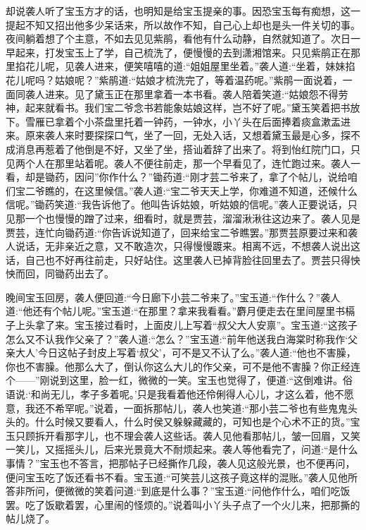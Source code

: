 \begin{parag}
    却说袭人听了宝玉方才的话，也明知是给宝玉提亲的事。因恐宝玉每有痴想，这一提起不知又招出他多少呆话来，所以故作不知，自己心上却也是头一件关切的事。夜间躺着想了个主意，不如去见见紫鹃，看他有什么动静，自然就知道了。次日一早起来，打发宝玉上了学，自己梳洗了，便慢慢的去到潇湘馆来。只见紫鹃正在那里掐花儿呢，见袭人进来，便笑嘻嘻的道:“姐姐屋里坐着。”袭人道:“坐着，妹妹掐花儿呢吗？姑娘呢？”紫鹃道:“姑娘才梳洗完了，等着温药呢。”紫鹃一面说着，一面同袭人进来。见了黛玉正在那里拿着一本书看。袭人陪着笑道:“姑娘怨不得劳神，起来就看书。我们宝二爷念书若能象姑娘这样，岂不好了呢。”黛玉笑着把书放下。雪雁已拿着个小茶盘里托着一钟药，一钟水，小丫头在后面捧着痰盒漱盂进来。原来袭人来时要探探口气，坐了一回，无处入话，又想着黛玉最是心多，探不成消息再惹着了他倒是不好，又坐了坐，搭讪着辞了出来了。将到怡红院门口，只见两个人在那里站着呢。袭人不便往前走，那一个早看见了，连忙跑过来。袭人一看，却是锄药，因问”你作什么？”锄药道:“刚才芸二爷来了，拿了个帖儿，说给咱们宝二爷瞧的，在这里候信。”袭人道:“宝二爷天天上学，你难道不知道，还候什么信呢。”锄药笑道:“我告诉他了。他叫告诉姑娘，听姑娘的信呢。”袭人正要说话，只见那一个也慢慢的蹭了过来，细看时，就是贾芸，溜溜湫湫往这边来了。袭人见是贾芸，连忙向锄药道:“你告诉说知道了，回来给宝二爷瞧罢。”那贾芸原要过来和袭人说话，无非亲近之意，又不敢造次，只得慢慢踱来。相离不远，不想袭人说出这话，自己也不好再往前走，只好站住。这里袭人已掉背脸往回里去了。贾芸只得怏怏而回，同锄药出去了。
\end{parag}


\begin{parag}
    晚间宝玉回房，袭人便回道:“今日廊下小芸二爷来了。”宝玉道:“作什么？”袭人道:“他还有个帖儿呢。”宝玉道:“在那里？拿来我看看。”麝月便走去在里间屋里书槅子上头拿了来。宝玉接过看时，上面皮儿上写着“叔父大人安禀”。宝玉道:“这孩子怎么又不认我作父亲了？”袭人道:“怎么？”宝玉道:“前年他送我白海棠时称我作‘父亲大人’今日这帖子封皮上写着‘叔父’，可不是又不认了么。”袭人道:“他也不害臊，你也不害臊。他那么大了，倒认你这么大儿的作父亲，可不是他不害臊？你正经连个——”刚说到这里，脸一红，微微的一笑。宝玉也觉得了，便道:“这倒难讲。俗语说:‘和尚无儿，孝子多着呢。’只是我看着他还伶俐得人心儿，才这么着，他不愿意，我还不希罕呢。”说着，一面拆那帖儿，袭人也笑道:“那小芸二爷也有些鬼鬼头头的。什么时候又要看人，什么时侯又躲躲藏藏的，可知也是个心术不正的货。”宝玉只顾拆开看那字儿，也不理会袭人这些话。袭人见他看那帖儿，皱一回眉，又笑一笑儿，又摇摇头儿，后来光景竟大不耐烦起来。袭人等他看完了，问道:“是什么事情？”宝玉也不答言，把那帖子已经撕作几段，袭人见这般光景，也不便再问，便问宝玉吃了饭还看书不看。宝玉道:“可笑芸儿这孩子竟这样的混账。”袭人见他所答非所问，便微微的笑着问道:“到底是什么事？”宝玉道:“问他作什么，咱们吃饭罢。吃了饭歇着罢，心里闹的怪烦的。”说着叫小丫头子点了一个火儿来，把那撕的帖儿烧了。
\end{parag}


